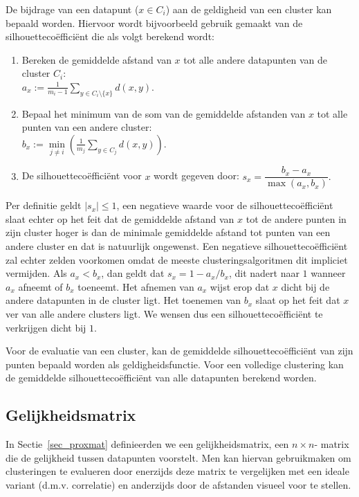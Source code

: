 \documentclass[a4paper,12pt]{article}
\theoremstyle{definition}
\begin{document}
De bijdrage van een datapunt ($x \in C_i$) aan de geldigheid van een cluster kan
bepaald worden. Hiervoor wordt bijvoorbeeld gebruik gemaakt van de silhouettecoëfficiënt die als volgt berekend wordt:
\begin{enumerate}
 \item Bereken de gemiddelde afstand van $x$ tot alle andere datapunten
 van de cluster $C_i$:\\ $a_x:=\frac{1}{m_i-1}\sum\limits_{y\in C_i\setminus\{x\}}d(x,y).$
 \item Bepaal het minimum van de som van de gemiddelde afstanden van $x$ tot alle punten
 van een andere cluster:\\
 $b_x:=\min\limits_{j\neq i}\left(\frac{1}{m_j}\sum\limits_{y\in C_j}d(x,y)\right).$
 \item De silhouettecoëfficiënt voor $x$ wordt gegeven door:
 $s_x = \dfrac{b_x-a_x}{\max(a_x,b_x)}.$
\end{enumerate}

Per definitie geldt $|s_x|\leq1$, een negatieve waarde voor de silhouettecoëfficiënt slaat echter op het feit dat de gemiddelde afstand van $x$ tot
de andere punten in zijn cluster hoger is dan de minimale gemiddelde afstand
tot punten van een andere cluster en dat is natuurlijk ongewenst.
Een negatieve silhouettecoëfficiënt zal echter zelden voorkomen
omdat de meeste clusteringsalgoritmen dit impliciet vermijden. Als $a_x<b_x$, dan
geldt dat $s_x = 1- a_x/b_x$, dit nadert naar
$1$ wanneer $a_x$ afneemt of $b_x$ toeneemt. Het afnemen van $a_x$
wijst erop dat $x$ dicht bij de andere datapunten in de cluster ligt.
Het toenemen van $b_x$ slaat op het feit dat $x$ ver van alle andere
clusters ligt. We wensen dus een silhouettecoëfficiënt te verkrijgen
dicht bij $1$.

Voor de evaluatie van een cluster, kan de gemiddelde silhouettecoëfficiënt
van zijn punten bepaald worden als geldigheidsfunctie. Voor
een volledige clustering kan de gemiddelde silhouettecoëfficiënt
van alle datapunten berekend worden.

\subsection{Gelijkheidsmatrix}
In Sectie~\ref{sec_proxmat} definieerden we een gelijkheidsmatrix, een $n\times n$- matrix die de gelijkheid tussen datapunten voorstelt.
Men kan hiervan gebruikmaken om clusteringen te evalueren door ener\-zijds deze matrix te vergelijken met een ideale variant (d.m.v. correlatie) en anderzijds
door de afstanden visueel voor te stellen.
\end{document}

